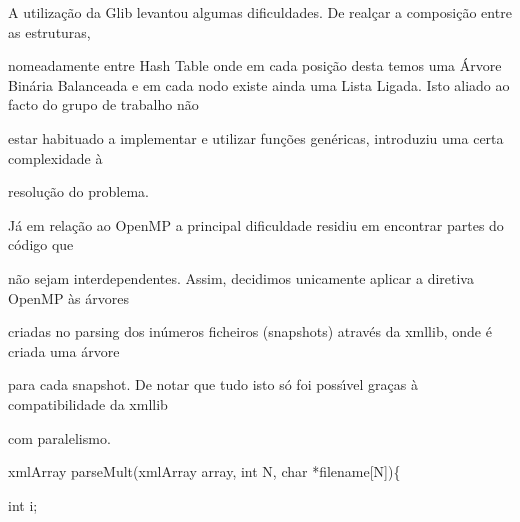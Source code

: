 \documentclass[a4paper,portrait,12pt]{article}
\begin{document}
\begin{flushleft}
A utilização da Glib levantou algumas dificuldades. De realçar a composição entre as estruturas,
\end{flushleft}


\begin{flushleft}
nomeadamente entre Hash Table onde em cada posição desta temos uma Árvore Binária Balanceada e em cada nodo existe ainda uma Lista Ligada. Isto aliado ao facto do grupo de trabalho não
\end{flushleft}


\begin{flushleft}
estar habituado a implementar e utilizar funções genéricas, introduziu uma certa complexidade à
\end{flushleft}


\begin{flushleft}
resolução do problema.
\end{flushleft}


\begin{flushleft}
Já em relação ao OpenMP a principal dificuldade residiu em encontrar partes do código que
\end{flushleft}


\begin{flushleft}
não sejam interdependentes. Assim, decidimos unicamente aplicar a diretiva OpenMP às árvores
\end{flushleft}


\begin{flushleft}
criadas no parsing dos inúmeros ficheiros (snapshots) através da xmllib, onde é criada uma árvore
\end{flushleft}


\begin{flushleft}
para cada snapshot. De notar que tudo isto só foi poss\i{}́vel graças à compatibilidade da xmllib
\end{flushleft}


\begin{flushleft}
com paralelismo.
\end{flushleft}





\begin{flushleft}
xmlArray parseMult(xmlArray array, int N, char *filename[N])\{
\end{flushleft}


\begin{flushleft}
int i;
\end{flushleft}
\end{document}
